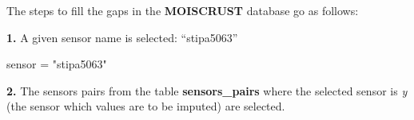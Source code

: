 \documentclass[]{article}
\newenvironment{Shaded}{\begin{snugshade}}{\end{snugshade}}
\newcommand{\KeywordTok}[1]{\textcolor[rgb]{0.13,0.29,0.53}{\textbf{#1}}}
\newcommand{\NormalTok}[1]{#1}
\newcommand{\OperatorTok}[1]{\textcolor[rgb]{0.81,0.36,0.00}{\textbf{#1}}}
\newcommand{\StringTok}[1]{\textcolor[rgb]{0.31,0.60,0.02}{#1}}
\begin{document}
The steps to fill the gaps in the \textbf{MOISCRUST} database go as
follows:

\textbf{1.} A given sensor name is selected: ``stipa5063''

\begin{Shaded}
\begin{Highlighting}[]
\NormalTok{sensor =}\StringTok{ "stipa5063"}
\end{Highlighting}
\end{Shaded}

\textbf{2.} The sensors pairs from the table \textbf{sensors\_pairs}
where the selected sensor is \emph{y} (the sensor which values are to be
imputed) are selected.

\begin{Shaded}
\end{Shaded}
\end{document}
